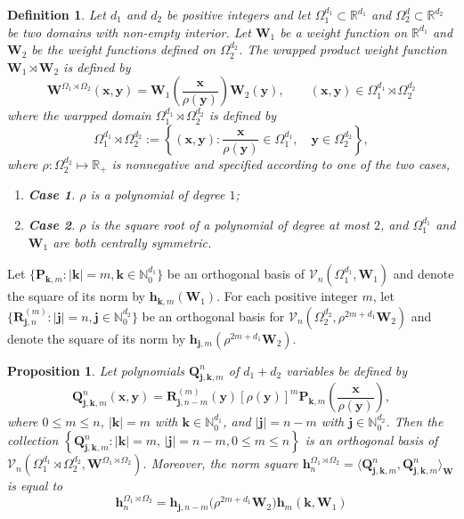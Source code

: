 \documentclass{amsart}
\newtheorem{prop}[thm]{Proposition}
\newtheorem{defn}[thm]{Definition}
\theoremstyle{remark}
\def\la{{\langle}}
\def\ra{{\rangle}}
\def\la{{\langle}}
\def\ra{{\rangle}}
\def\jb{{\bm j}}
\def\hb{{\bm h}}
\def\kb{{\bm k}}
\def\xb{{\bm x}}
\def\yb{{\bm y}}
\def\Pb{{\bm P}}
\def\Qb{{\bm Q}}
\def\Rb{{\bm R}}
\def\Wb{{\bm W}}
\def\CV{{\mathcal V}}
\def\NN{{\mathbb N}}
\def\RR{{\mathbb R}}
\def\VV{{\mathbb V}}
\begin{document}
\begin{defn} \label{defn:wrap}
Let $d_1$ and $d_2$ be positive integers and let $\Omega_1^{d_1} \subset \RR^{d_1}$ and 
$\Omega_2^d \subset \RR^{d_2}$ be two domains with non-empty interior. Let $\Wb_1$ be a weight 
function on $\RR^{d_1}$ and $\Wb_2$ be the weight functions defined on $\Omega_2^{d_2}$. 
The wrapped product weight function $\Wb_1 \rtimes \Wb_2$ is defined by 
\begin{equation}\label{eq:wrapW}
\Wb^{\Omega_1\rtimes \Omega_2}(\xb,\yb) =\Wb_1\left( \frac{\xb} {\rho(\yb)} \right) \Wb_2(\yb) , 
   \qquad (\xb, \yb) \in \Omega_1^{d_1} \rtimes \Omega_2^{d_2}%
\end{equation}
where the warpped domain $\Omega_1^{d_1} \rtimes \Omega_2^{d_2}$ is defined by 
\begin{equation} \label{eq:wrapDomain}
\Omega_1^{d_1}  \rtimes \Omega_2^{d_2}:= \left\{(\xb,\yb): \frac{\xb}{\rho(\yb)} \in \Omega_1^{d_1} , 
\quad \yb \in \Omega_2^{d_2} \right\}, 
\end{equation}
where $\rho: \Omega_2^{d_2} \mapsto \RR_+$ is nonnegative and specified according to one of the two cases,
\begin{enumerate}[    ]
\item[] {\bf Case 1}. $\rho$ is a polynomial of degree $1$; \smallskip
\item[] {\bf Case 2}. $\rho$ is the square root of a polynomial of degree at most $2$, and $\Omega_1^{d_1} $ 
and $\Wb_1$ are both centrally symmetric. 
\end{enumerate}
\end{defn}

Let $\{\Pb_{\kb, m}: |\kb| = m, \kb \in \NN_0^{d_1}\}$ be an orthogonal basis of $\CV_n(\Omega_1^{d_1}, \Wb_1)$ and
denote the square of its norm by $\hb_{\kb,m}(\Wb_1)$. For each positive integer $m$, let 
$\big\{\Rb^{(m)}_{\jb, n}: |\jb| = n, \jb \in \NN_0^{d_2}\big\}$ be an orthogonal basis for 
$\CV_n\left(\Omega_2^{d_2}, \rho^{2m + d_1} \Wb_2\right)$ and denote the square of its norm by 
$\hb_{\jb,m}(\rho^{2m+d_1}\Wb_2)$.

\begin{prop} \label{prop:wrapped_orth}
Let polynomials $\Qb_{\jb, \kb, m}^n$ of $d_1+d_2$ variables be defined by
\begin{equation}\label{eq:wrapOP}
   \Qb_{\jb, \kb, m}^n(\xb, \yb) = \Rb_{\jb,n-m}^{(m)}(\yb) [\rho(\yb)]^m \Pb_{\kb,m}\left(\frac{\xb}{\rho(\yb)}\right),  
\end{equation}
where $0 \le m \le n$, $|\kb| = m$ with $\kb \in \NN_0^{d_1}$, and $|\jb| = n-m$ with $\jb \in \NN_0^{d_2}$. 
Then the collection $\left\{  \Qb_{\jb, \kb, m}^n: |\kb| = m,\,  |\jb| = n-m, 0 \le m \le n\right\}$ is an orthogonal basis 
of $\CV_n(\Omega_1^{d_1}  \rtimes \Omega_2^{d_2}, \Wb^{\Omega_1\rtimes \Omega_2})$.
Moreover, the norm square $\hb_n^{\Omega_1\rtimes \Omega_2}
 = \la  \Qb_{\jb, \kb, m}^n, \Qb_{\jb, \kb, m}^n\ra_\Wb$ is equal to 
$$
\hb_n^{\Omega_1\rtimes \Omega_2} = \hb_{\jb, n-m}\big(\rho^{2m+d_1}\Wb_2\big) \hb_m(\kb, \Wb_1)
$$
\end{prop}
\end{document}
